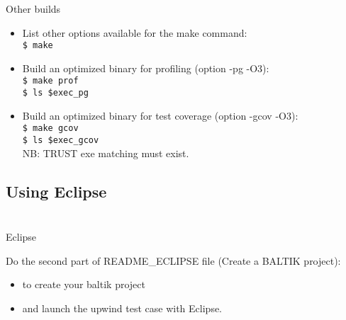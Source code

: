 \documentclass[10pt, hyperref={unicode=true,pdfusetitle, bookmarks=true,bookmarksnumbered=false,bookmarksopen=false, breaklinks=false,pdfborder={0 0 1},backref=true,colorlinks=true,linkcolor=darkblue,pageanchor, urlcolor=darkblue}]{beamer}
\begin{document}
\begin{frame}
\frametitle{}
\begin{block}{Other builds}

\begin{itemize}
\item List other options available for the make command:\\
\texttt{\$ make}

\item Build an optimized binary for profiling (option -pg -O3):\\
\texttt{\$ make prof}\\
\texttt{\$ ls \$exec\_pg}

\item Build an optimized binary for test coverage (option -gcov -O3):\\
\texttt{\$ make gcov}\\
\texttt{\$ ls \$exec\_gcov}\\
NB: TRUST exe matching must exist. \\
\end{itemize}

\end{block}
\end{frame}



\subsection{{\bf{Using Eclipse}}}
\begin{frame}
\begin{columns}[c] 
\tableofcontents[sections={1-3},currentsection, currentsubsection]
\tableofcontents[sections={4-8},currentsection, currentsubsection]
\end{columns}
\end{frame}
\begin{frame}
\frametitle{}
\begin{block}{Eclipse}

Do the second part of README\_ECLIPSE file (Create a BALTIK project):
\begin{itemize}
\item to create your baltik project
\item and launch the upwind test case with Eclipse.
\end{itemize}

\end{block}
\end{frame}
\end{document}

